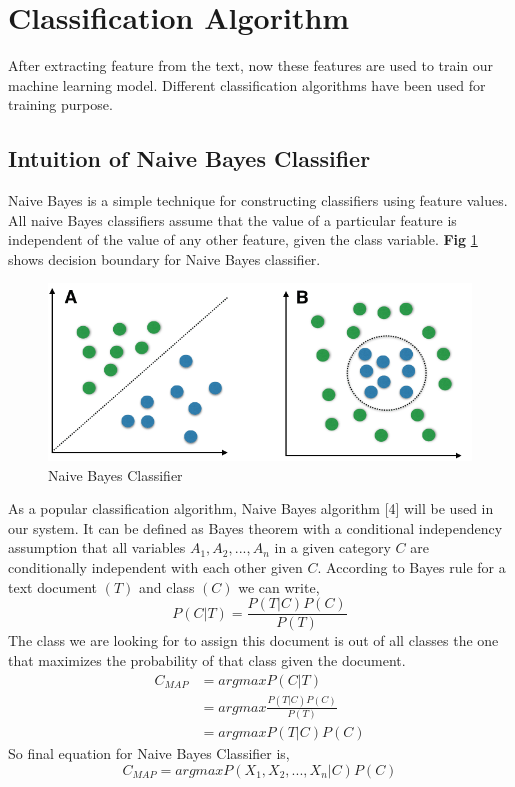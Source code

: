 \section{Classification Algorithm}
After extracting feature from the text, now these features are used to train our machine learning model. Different classification algorithms have been used for training purpose.

\subsection{Intuition of Naive Bayes Classifier}
Naive Bayes is a simple technique for constructing classifiers using feature values. All naive Bayes classifiers assume that the value of a particular feature is independent of the value of any other feature, given the class variable. \textbf{Fig} \ref{fig:NBC} shows decision boundary for Naive Bayes classifier.

\begin{figure}[h!]
    \centering
    \includegraphics[scale=0.4]{Figures/naive_bayes.png}
    \caption{Naive Bayes Classifier}
    \label{fig:NBC}
\end{figure}

As a popular classification algorithm, Naive Bayes algorithm [4] will be used in our system. It can be defined as Bayes theorem with a conditional independency assumption that all variables $A_{1},A_{2},...,A_{n}$ in a given category $C$ are conditionally independent with each other given $C$. 
According to Bayes rule for a text document $(T)$ and class $(C)$ we can write,$$ P(C|T) = \frac{P(T|C)P(C)}{P(T)}$$
The class we are looking for to assign this document is out of all classes the one that maximizes the probability of that class given the document.
\begin{equation}\label{eq:11}
 \begin{aligned}
     C_{MAP} & = argmax P(C|T) \\     & = argmax \frac{P(T|C)P(C)}{P(T)}\\
    & = argmax {P(T|C)P(C)}
\end{aligned}
\end{equation}
So final equation for Naive Bayes Classifier is,
\begin{equation}
     C_{MAP} = argmax P(X_{1},X_{2},...,X_{n}|C)P(C)
\end{equation}

